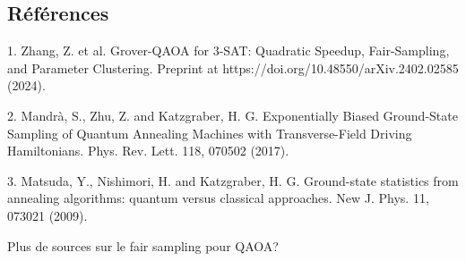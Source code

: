 \subsection*{Références}

1. Zhang, Z. et al. Grover-QAOA for 3-SAT: Quadratic Speedup, Fair-Sampling, and Parameter Clustering. Preprint at https://doi.org/10.48550/arXiv.2402.02585 (2024).

2. Mandrà, S., Zhu, Z. and Katzgraber, H. G. Exponentially Biased Ground-State Sampling of Quantum Annealing Machines with Transverse-Field Driving Hamiltonians. Phys. Rev. Lett. 118, 070502 (2017).

3. Matsuda, Y., Nishimori, H. and Katzgraber, H. G. Ground-state statistics from annealing algorithms: quantum versus classical approaches. New J. Phys. 11, 073021 (2009).

Plus de sources sur le fair sampling pour QAOA?
